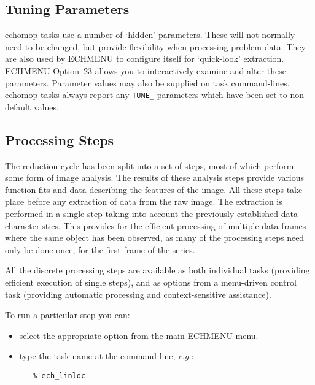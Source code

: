 \subsection{Tuning Parameters}

{\sc echomop} tasks use a number of `hidden'
parameters.
These will not normally need to be changed, but provide flexibility when
processing problem data.  They are also used by ECHMENU to configure itself
for `quick-look' extraction. 
ECHMENU Option~23 allows you to interactively examine and alter these
parameters.  Parameter values may also be supplied on task command-lines.
{\sc echomop} tasks always report any \verb+TUNE_+ parameters which have
been set to non-default values.


\subsection{Processing Steps}

The reduction cycle has been split into a set of steps, most of which
perform some form of image analysis.  The results of these analysis steps
provide various function fits and data  describing the features of the
image. All these steps take place before any extraction of data from the
raw image. The extraction is performed in a single step taking into account
the previously established data characteristics. This provides for the
efficient processing of multiple data frames
where the same object has been observed, as many of the processing steps
need only be done once, for the first frame of the series.

All the discrete processing steps are available as both individual tasks
(providing efficient execution of single steps), and as options from a
menu-driven control task (providing automatic processing and context-sensitive
assistance).

To run a particular step you can:

\begin{itemize}

\item select the appropriate option from the main ECHMENU menu.

\item type the task name at the command line, {\it{e.g.}}:

\begin{verbatim}
   % ech_linloc
\end{verbatim}

\end{itemize}

